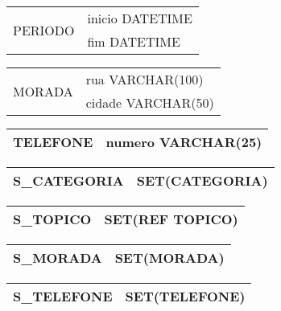 \documentclass[a4paper,12pt]{article}
\begin{document}
\begin{tabular}{|c|l|} \hline
\multirow{2}{*}{PERIODO}
& inicio DATETIME \\
& fim DATETIME \\ \hline 
\end{tabular}

\begin{tabular}{|c|l|} \hline
\multirow{2}{*}{MORADA}
& rua VARCHAR(100) \\
& cidade VARCHAR(50) \\ \hline 
\end{tabular}

\begin{tabular}{|c|l|} \hline
TELEFONE & numero VARCHAR(25) \\ \hline 
\end{tabular}



\begin{tabular}{|c|l|} \hline
S\_CATEGORIA & SET(CATEGORIA) \\ \hline
\end{tabular}

\begin{tabular}{|c|l|} \hline
S\_TOPICO & SET(REF TOPICO) \\ \hline
\end{tabular}

\begin{tabular}{|c|l|} \hline
S\_MORADA & SET(MORADA) \\ \hline
\end{tabular}

\begin{tabular}{|c|l|} \hline
S\_TELEFONE & SET(TELEFONE) \\ \hline
\end{tabular}
\end{document}
